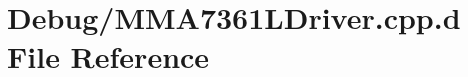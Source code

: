 \hypertarget{_debug_2_m_m_a7361_l_driver_8cpp_8d}{\section{\-Debug/\-M\-M\-A7361\-L\-Driver.cpp.\-d \-File \-Reference}
\label{_debug_2_m_m_a7361_l_driver_8cpp_8d}
}
